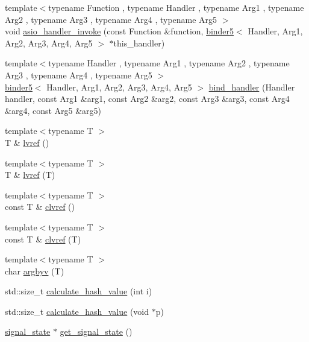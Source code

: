 \begin{DoxyCompactItemize}
\item 
{\footnotesize template$<$typename Function , typename Handler , typename Arg1 , typename Arg2 , typename Arg3 , typename Arg4 , typename Arg5 $>$ }\\void \hyperlink{namespaceasio_1_1detail_a3186135624eed6067dc9d4c7ca6e7c13}{asio\+\_\+handler\+\_\+invoke} (const Function \&function, \hyperlink{classasio_1_1detail_1_1binder5}{binder5}$<$ Handler, Arg1, Arg2, Arg3, Arg4, Arg5 $>$ $\ast$this\+\_\+handler)
\item 
{\footnotesize template$<$typename Handler , typename Arg1 , typename Arg2 , typename Arg3 , typename Arg4 , typename Arg5 $>$ }\\\hyperlink{classasio_1_1detail_1_1binder5}{binder5}$<$ Handler, Arg1, Arg2, Arg3, Arg4, Arg5 $>$ \hyperlink{namespaceasio_1_1detail_a3d2518b39bc0752405a7f2df14f07d41}{bind\+\_\+handler} (Handler handler, const Arg1 \&arg1, const Arg2 \&arg2, const Arg3 \&arg3, const Arg4 \&arg4, const Arg5 \&arg5)
\item 
{\footnotesize template$<$typename T $>$ }\\T \& \hyperlink{namespaceasio_1_1detail_a8e3a6211349494216e010cf5509c5ad3}{lvref} ()
\item 
{\footnotesize template$<$typename T $>$ }\\T \& \hyperlink{namespaceasio_1_1detail_a31ddc1087708cdbd63e57448412b3429}{lvref} (T)
\item 
{\footnotesize template$<$typename T $>$ }\\const T \& \hyperlink{namespaceasio_1_1detail_ab2895986e0d90fdc4b0b60c91713262b}{clvref} ()
\item 
{\footnotesize template$<$typename T $>$ }\\const T \& \hyperlink{namespaceasio_1_1detail_acc09e978c5f403bc76d6c74142b64e1e}{clvref} (T)
\item 
{\footnotesize template$<$typename T $>$ }\\char \hyperlink{namespaceasio_1_1detail_ab42f16c77967396f145c7c63ad1c39bb}{argbyv} (T)
\item 
std\+::size\+\_\+t \hyperlink{namespaceasio_1_1detail_a4ace762a8250e70ec10ba7d7c4afc0e3}{calculate\+\_\+hash\+\_\+value} (int i)
\item 
std\+::size\+\_\+t \hyperlink{namespaceasio_1_1detail_aec0a81bdf46d555cfc1d5315a4cd0545}{calculate\+\_\+hash\+\_\+value} (void $\ast$p)
\item 
\hyperlink{structasio_1_1detail_1_1signal__state}{signal\+\_\+state} $\ast$ \hyperlink{namespaceasio_1_1detail_a36e93386e27cefdbfacb55511fec5dc7}{get\+\_\+signal\+\_\+state} ()

\end{DoxyCompactItemize}

